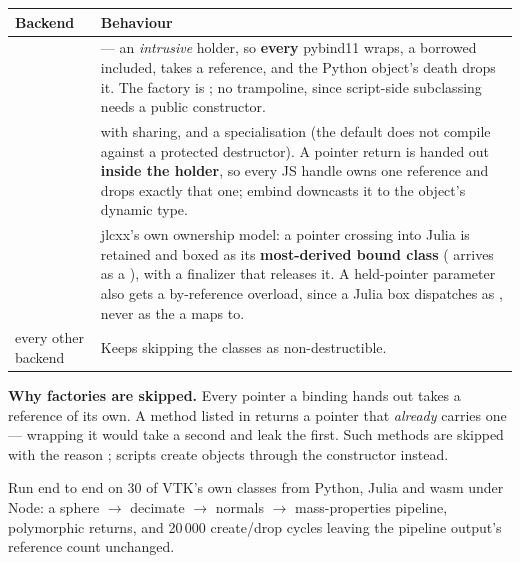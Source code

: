 \begin{center}
\small
\begin{tabular}{@{}lL{10.2cm}@{}}
\toprule
\textbf{Backend} & \textbf{Behaviour} \\
\midrule
{} &  ---
  an \emph{intrusive} holder, so \textbf{every}  pybind11 wraps, a
  borrowed  included, takes a reference, and the Python
  object's death drops it. The factory is ; no trampoline, since
  script-side subclassing needs a public constructor. \\
\addlinespace
{} &  with 
  sharing, and a  specialisation (the default
   does not compile against a protected destructor). A pointer
  return is handed out \textbf{inside the holder}, so every JS handle owns one
  reference and  drops exactly that one; embind downcasts it to
  the object's dynamic type. \\
\addlinespace
{} & jlcxx's own ownership model: a pointer crossing into Julia is
  retained and boxed as its \textbf{most-derived bound class}
  ( arrives as a ), with a
  finalizer that releases it. A held-pointer parameter also gets a by-reference
  overload, since a Julia box dispatches as , never as the
   a  maps to. \\
\addlinespace
every other backend & Keeps skipping the classes as non-destructible. \\
\bottomrule
\end{tabular}
\end{center}

\begin{note}
\textbf{Why factories are skipped.} Every pointer a binding hands out takes a
reference of its own. A method listed in  returns a
pointer that \emph{already} carries one --- wrapping it would take a second and
leak the first. Such methods are skipped with the reason
; scripts create objects through the constructor
instead.
\end{note}

Run end to end on 30 of VTK's own classes from Python, Julia and wasm under
Node: a sphere $\to$ decimate $\to$ normals $\to$ mass-properties pipeline,
polymorphic returns, and 20\,000 create/drop cycles leaving the pipeline
output's reference count unchanged.

